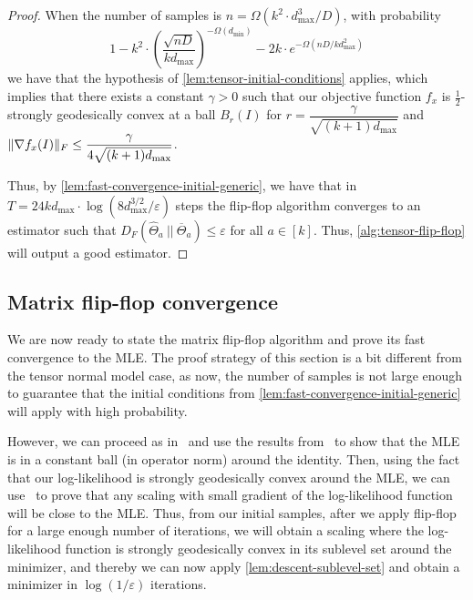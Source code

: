 \documentclass[aos]{imsart}
\theoremstyle{definition}
\numberwithin{equation}{section}
\DeclarePairedDelimiter{\norm}{\lVert}{\rVert}
\newcommand{\otheta}{\overline{\Theta}}
\newcommand{\htheta}{\widehat{\Theta}}
\newcommand{\eps}{\varepsilon}
\def\dmin{d_{\min}}
\def\dmax{d_{\max}}
\begin{document}
\begin{proof}
	When the number of samples is $n = \Omega(k^2 \cdot \dmax^3/D)$, with probability 
	$$ 1 - k^2 \cdot \left( \dfrac{\sqrt{nD}}{k \dmax} \right)^{-\Omega(\dmin)} - 2k \cdot e^{- \Omega(nD/k \dmax^2)}$$ 
	we have that the hypothesis of \cref{lem:tensor-initial-conditions} applies, which implies that there exists a constant $\gamma > 0$ such that our objective function $f_x$ is $\frac{1}{2}$-strongly geodesically convex at a ball $B_r(I)$ for $r = \dfrac{\gamma}{\sqrt{(k+1)\dmax}}$ and $\norm{\nabla f_x(I)}_F \leq \dfrac{\gamma}{4 \sqrt{(k+1)\dmax}}$.
	
Thus, by \cref{lem:fast-convergence-initial-generic}, we have that in $T = 24k \dmax \cdot \log(8 \dmax^{3/2}/\eps)$ steps the flip-flop algorithm converges to an estimator such that $D_F(\htheta_a \ || \ \otheta_a) \leq \eps$ for all $a \in [k]$. Thus, \cref{alg:tensor-flip-flop} will output a good estimator.
\end{proof}

\subsection{Matrix flip-flop convergence}

We are now ready to state the matrix flip-flop algorithm and prove its fast convergence to the MLE. 
The proof strategy of this section is a bit different from the tensor normal model case, as now, the number of samples is not large enough to guarantee that the initial conditions from \cref{lem:fast-convergence-initial-generic} will apply with high probability.

However, we can proceed as in~\cite{FM20} and use the results from~\cite{KLR19} to show that the MLE is in a constant ball (in operator norm) around the identity. 
Then, using the fact that our log-likelihood is strongly geodesically convex around the MLE, we can use~\cite[Lemma 4.7]{FM20} to prove that any scaling with small gradient of the log-likelihood function will be close to the MLE.
Thus, from our initial samples, after we apply flip-flop for a large enough number of iterations, we will obtain a scaling where the log-likelihood function is strongly geodesically convex in its sublevel set around the minimizer, and thereby we can now apply \cref{lem:descent-sublevel-set} and obtain a minimizer in $\log(1/\varepsilon)$ iterations.
\end{document}

